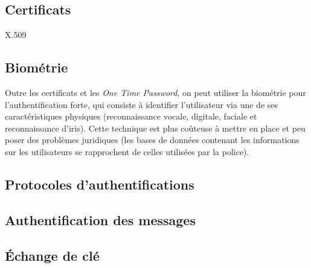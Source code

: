 \subsection{Certificats}
X.509

\subsection{Biométrie}
Outre les certificats et les \emph{One Time Password}, on peut
utiliser la biométrie pour l'authentification forte, qui consiste
à identifier l'utilisateur via une de ses caractéristiques
physiques (reconnaissance vocale, digitale, faciale et
reconnaissance d'iris).
Cette technique est plus coûteuse à mettre en place et peu poser
des problèmes juridiques (les bases de données contenant les
informations sur les utilisateurs se rapprochent de celles
utilisées par la police).
\subsection{Protocoles d'authentifications}

\subsection{Authentification des messages}

\subsection{Échange de clé}
